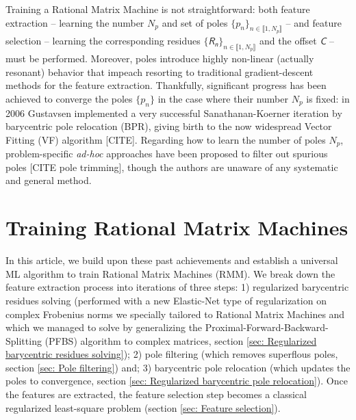 \documentclass{article}
\newcommand{\mat}[1]{\bm{\mathsfit{#1}}}
\begin{document}
Training a Rational Matrix Machine is not straightforward: both feature extraction -- learning the number $N_p$ and set of poles $\big\{ p_n \big\}_{n \in \llbracket 1, N_p \rrbracket}$ -- and feature selection -- learning the corresponding residues $\big\{ \mat{R_n} \big\}_{n \in \llbracket 1, N_p \rrbracket}$ and the offset $\mat{C}$ -- must be performed.
Moreover, poles introduce highly non-linear (actually resonant) behavior that impeach resorting to traditional gradient-descent methods for the feature extraction.
Thankfully, significant progress has been achieved to converge the poles $\big\{ p_n \big\}$ in the case where their number $N_p$ is fixed: in 2006 Gustavsen implemented a very successful Sanathanan-Koerner iteration by barycentric pole relocation (BPR), giving birth to the now widespread Vector Fitting (VF) algorithm [CITE]. 
Regarding how to learn the number of poles $N_p$, problem-specific \textit{ad-hoc} approaches have been proposed to filter out spurious poles [CITE pole trimming], though the authors are unaware of any systematic and general method.

\section{\label{sec: Training Rational Matrix Machines}Training Rational Matrix Machines}

In this article, we build upon these past achievements and establish a universal ML algorithm to train Rational Matrix Machines (RMM). We break down the feature extraction process into iterations of three steps: 1) regularized barycentric residues solving (performed with a new Elastic-Net type of regularization on complex Frobenius norms we specially tailored to Rational Matrix Machines and which we managed to solve by generalizing the Proximal-Forward-Backward-Splitting (PFBS) algorithm to complex matrices, section \ref{sec: Regularized barycentric residues solving}); 2) pole filtering (which removes superflous poles, section \ref{sec: Pole filtering}) and; 3) barycentric pole relocation (which updates the poles to convergence, section \ref{sec: Regularized barycentric pole relocation}).
Once the features are extracted, the feature selection step becomes a classical regularized least-square problem (section \ref{sec: Feature selection}). 
\end{document}
